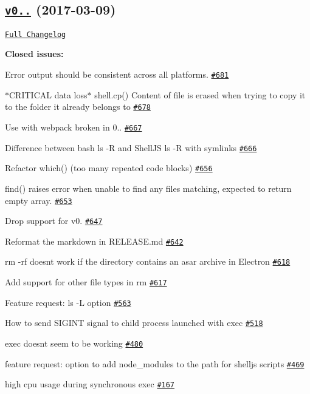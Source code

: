 \subsection*{\href{https://github.com/shelljs/shelljs/tree/v0.7.7}{\tt v0..} (2017-\/03-\/09)}

\href{https://github.com/shelljs/shelljs/compare/v0.7.6...v0.7.7}{\tt Full Changelog}

{\bfseries Closed issues\+:}


\begin{DoxyItemize}
\item Error output should be consistent across all platforms. \href{https://github.com/shelljs/shelljs/issues/681}{\tt \#681}
\item $\ast$\+C\+R\+I\+T\+I\+C\+AL data loss$\ast$ shell.\+cp() Content of file is erased when trying to copy it to the folder it already belongs to \href{https://github.com/shelljs/shelljs/issues/678}{\tt \#678}
\item Use with webpack broken in 0.. \href{https://github.com/shelljs/shelljs/issues/667}{\tt \#667}
\item Difference between bash ls -\/R and Shell\+JS ls -\/R with symlinks \href{https://github.com/shelljs/shelljs/issues/666}{\tt \#666}
\item Refactor which() (too many repeated code blocks) \href{https://github.com/shelljs/shelljs/issues/656}{\tt \#656}
\item find() raises error when unable to find any files matching, expected to return empty array. \href{https://github.com/shelljs/shelljs/issues/653}{\tt \#653}
\item Drop support for v0. \href{https://github.com/shelljs/shelljs/issues/647}{\tt \#647}
\item Reformat the markdown in R\+E\+L\+E\+A\+S\+E.\+md \href{https://github.com/shelljs/shelljs/issues/642}{\tt \#642}
\item rm -\/rf doesn\textquotesingle{}t work if the directory contains an asar archive in Electron \href{https://github.com/shelljs/shelljs/issues/618}{\tt \#618}
\item Add support for other file types in rm \href{https://github.com/shelljs/shelljs/issues/617}{\tt \#617}
\item Feature request\+: ls -\/L option \href{https://github.com/shelljs/shelljs/issues/563}{\tt \#563}
\item How to send S\+I\+G\+I\+NT signal to child process launched with exec \href{https://github.com/shelljs/shelljs/issues/518}{\tt \#518}
\item exec doesnt seem to be working \href{https://github.com/shelljs/shelljs/issues/480}{\tt \#480}
\item feature request\+: option to add node\+\_\+modules to the path for shelljs scripts \href{https://github.com/shelljs/shelljs/issues/469}{\tt \#469}
\item high cpu usage during synchronous exec \href{https://github.com/shelljs/shelljs/issues/167}{\tt \#167}
\end{DoxyItemize}

